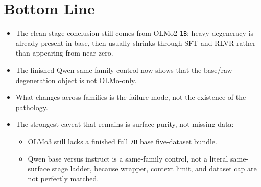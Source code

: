 \documentclass[11pt]{article}
\begin{document}
\section*{Bottom Line}
\begin{itemize}[leftmargin=1.5em]
\item The clean stage conclusion still comes from OLMo2 \texttt{1B}: heavy degeneracy is already present in base, then usually shrinks through SFT and RLVR rather than appearing from near zero.
\item The finished Qwen same-family control now shows that the base/raw degeneration object is not OLMo-only.
\item What changes across families is the failure mode, not the existence of the pathology.
\item The strongest caveat that remains is surface purity, not missing data:
\begin{itemize}[leftmargin=1.5em]
\item OLMo3 still lacks a finished full \texttt{7B} base five-dataset bundle.
\item Qwen base versus instruct is a same-family control, not a literal same-surface stage ladder, because wrapper, context limit, and dataset cap are not perfectly matched.
\end{itemize}
\end{itemize}
\end{document}
